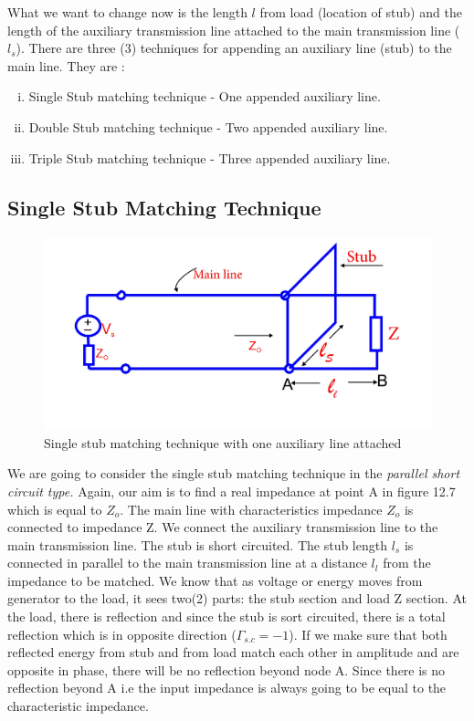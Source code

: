 What we want to change now is the length $l$ from load (location of stub) and the length of the auxiliary transmission line attached to the main transmission line ($l_s$). There are three (3) techniques for appending an auxiliary line (stub) to the main line. They are :
\begin{enumerate}[(i)]
\item Single Stub matching technique - One appended auxiliary line.
\item Double Stub matching technique - Two appended auxiliary line.
\item Triple Stub matching technique - Three appended auxiliary line.  
\end{enumerate} 
\subsection{Single Stub Matching Technique }
\begin{figure}[h]
\centering
\includegraphics[width=1\linewidth]{./graphics/fig11}
\caption{Single stub matching technique with one auxiliary line attached}
\end{figure}

We are going to consider the single stub matching technique in the\textit{ parallel short circuit type.} Again, our aim is to find a real impedance at point A in figure 12.7 which is equal to $Z_o$. The main line with characteristics impedance $ Z_o$ is connected to impedance Z. We connect the auxiliary transmission line to the main transmission line. The stub is short circuited. The stub length $l_s$ is connected in parallel to the main transmission line at a distance $ l_l$ from the impedance to be matched. We know that as voltage or energy moves from generator to the load, it sees two(2) parts: the stub section and load Z section. At the load, there is  reflection and since the stub is sort circuited, there is a total reflection which is in opposite direction ($\Gamma_{s.c} = -1$). If we make sure that both reflected energy from stub and  from load match each other in amplitude and are opposite in phase, there will be no reflection beyond node A. Since there is no reflection beyond A i.e the input impedance is always going to be equal to the characteristic impedance.\\

